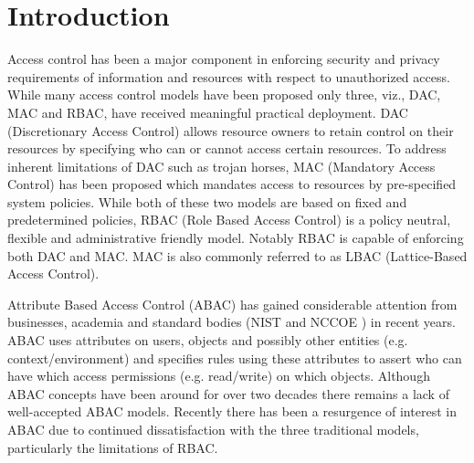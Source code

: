 \section{Introduction}

Access control has been a major component in enforcing security and privacy requirements of information and resources with respect to unauthorized access. While many access control models have been proposed only three, viz., DAC, MAC and RBAC, have received meaningful practical deployment. DAC (Discretionary Access Control) \cite{sandhu1994access} allows resource owners to retain control on their resources by specifying who can or cannot access certain resources. To address inherent limitations of DAC such as trojan horses, MAC (Mandatory Access Control) \cite{sandhu1994access}  has been proposed which mandates access to resources by pre-specified system policies. While both of these two models are based on fixed and predetermined policies, RBAC (Role Based Access Control) \cite{rbac} is a policy neutral, flexible and administrative friendly model.  Notably RBAC is capable of enforcing both DAC and MAC.  MAC is also commonly referred to as LBAC (Lattice-Based Access Control).

Attribute Based Access Control (ABAC) has gained considerable attention from businesses, academia and standard bodies (NIST \cite{nist-abac-draft} and NCCOE \cite{nccoe-abac-draft}) in recent years. ABAC uses attributes on users, objects and possibly other entities (e.g. context/environment) and specifies rules using these attributes to assert who can have which access permissions (e.g. read/write) on which objects.  Although ABAC concepts have been around for over two decades there remains a lack of well-accepted ABAC models.  Recently there has been a resurgence of interest in ABAC due to continued dissatisfaction with the three traditional models, particularly the limitations of RBAC.



